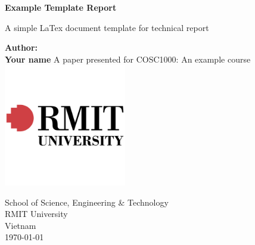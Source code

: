 \begin{titlepage}
    \begin{center}
        \Huge
        \textbf{Example Template Report}

        \vspace{0.5cm}
        \Large
       A simple LaTex document template for technical report

        \vspace{1.0cm}
        
        \textbf{
        \textbf{Author:\\}
        Your name
        }
        \vspace{0.4cm}
        \vfill
        A paper presented for COSC1000: An example course
        \vspace{0.8cm}
        \includegraphics[width=0.4\textwidth]{RMIT.png}

        \Large
        School of Science, Engineering \& Technology\\
        RMIT University\\
        Vietnam\\
        \today
        
    \end{center}
    
\end{titlepage}
